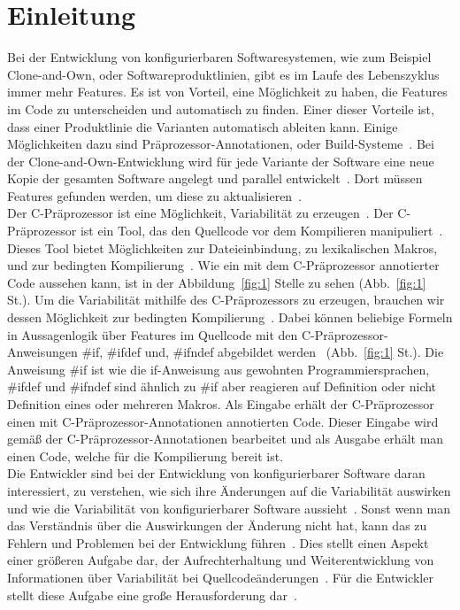 \chapter{Einleitung}
%


Bei der Entwicklung von konfigurierbaren Softwaresystemen, wie zum Beispiel Clone-and-Own, oder Softwareproduktlinien, gibt es im Laufe des Lebenszyklus immer mehr Features. Es ist von Vorteil, eine Möglichkeit zu haben, die Features im Code zu unterscheiden und automatisch zu finden. Einer dieser Vorteile ist, dass einer Produktlinie die Varianten automatisch ableiten kann. Einige Möglichkeiten dazu sind Präprozessor-Annotationen, oder Build-Systeme~\cite{ABKS13}. Bei der Clone-and-Own-Entwicklung wird für jede Variante der Software eine neue Kopie der gesamten Software angelegt und parallel entwickelt~\cite{BTS+:ESECFSE22}. Dort müssen Features gefunden werden, um diese zu aktualisieren~\cite{BTS+:ESECFSE22,KTSB:ICSE21,KB:VaMoS20,KB:ESECFSE20,KKK+:SPLC18,ZSL+:ICSE18}.\\


Der C-Präprozessor ist eine Möglichkeit, Variabilität zu erzeugen~\cite{ABKS13}. Der C-Präprozessor ist ein Tool, das den Quellcode vor dem Kompilieren manipuliert~\cite{ABKS13}. Dieses Tool bietet Möglichkeiten zur Dateieinbindung, zu lexikalischen Makros, und zur bedingten Kompilierung~\cite{ABKS13}. Wie ein mit dem  C-Präprozessor annotierter Code aussehen kann, ist in der Abbildung~\ref{fig:1} Stelle  zu sehen (Abb.~\ref{fig:1} St.). Um die Variabilität mithilfe des C-Präprozessors zu erzeugen, brauchen wir dessen Möglichkeit zur bedingten Kompilierung~\cite{ABKS13}. Dabei können beliebige Formeln in Aussagenlogik über Features im Quellcode mit den C-Präprozessor-Anweisungen \#if, \#ifdef und, \#ifndef abgebildet werden~\cite{BTS+:ESECFSE22} (Abb.~\ref{fig:1} St.). Die Anweisung \#if ist wie die if-Anweisung aus gewohnten Programmiersprachen, \#ifdef und \#ifndef sind ähnlich zu \#if aber reagieren auf Definition oder nicht Definition eines oder mehreren Makros. Als Eingabe erhält der C-Präprozessor einen mit C-Präprozessor-Annotationen annotierten Code. Dieser Eingabe wird gemäß der C-Präprozessor-Annotationen bearbeitet und als Ausgabe erhält man einen Code, welche für die Kompilierung bereit ist.  \\

Die Entwickler sind bei der Entwicklung von konfigurierbarer Software daran interessiert, zu verstehen, wie sich ihre Änderungen auf die Variabilität auswirken und wie die Variabilität von konfigurierbarer Software aussieht~\cite{BTS+:ESECFSE22}. Sonst wenn man das Verständnis über die Auswirkungen der Änderung nicht hat, kann das zu Fehlern und Problemen bei der Entwicklung führen~\cite{BTS+:ESECFSE22,NBA+:JSS15, NST+:SoSyM22,SBT:JSS19, SNB+:VaMoS21,KATS:TOSEM12}. Dies stellt einen Aspekt einer größeren Aufgabe dar, der Aufrechterhaltung und Weiterentwicklung von Informationen über Variabilität bei Quellcodeänderungen~\cite{BTS+:ESECFSE22}. Für die Entwickler stellt diese Aufgabe eine große Herausforderung dar~\cite{BTS+:ESECFSE22,PCA+:VAMOS13, PTD+:EMSE16, SHA:SPLC12}.\\

